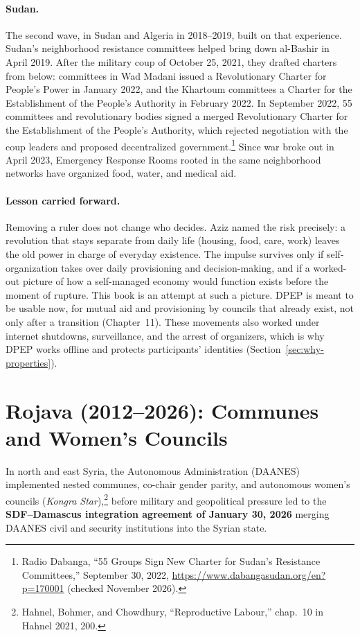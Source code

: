 \documentclass[10pt,twoside,openany]{book}
\theoremstyle{dpepstyle}
\begin{document}
\paragraph{Sudan.} The second wave, in Sudan and Algeria in 2018--2019, built on that experience. Sudan's neighborhood resistance committees helped bring down al-Bashir in April 2019. After the military coup of October 25, 2021, they drafted charters from below: committees in Wad Madani issued a Revolutionary Charter for People's Power in January 2022, and the Khartoum committees a Charter for the Establishment of the People's Authority in February 2022. In September 2022, 55 committees and revolutionary bodies signed a merged Revolutionary Charter for the Establishment of the People's Authority, which rejected negotiation with the coup leaders and proposed decentralized government.\footnote{Radio Dabanga, ``55 Groups Sign New Charter for Sudan's Resistance Committees,'' September 30, 2022, \url{https://www.dabangasudan.org/en?p=170001} (checked November 2026).} Since war broke out in April 2023, Emergency Response Rooms rooted in the same neighborhood networks have organized food, water, and medical aid.

\paragraph{Lesson carried forward.} Removing a ruler does not change who decides. Aziz named the risk precisely: a revolution that stays separate from daily life (housing, food, care, work) leaves the old power in charge of everyday existence. The impulse survives only if self-organization takes over daily provisioning and decision-making, and if a worked-out picture of how a self-managed economy would function exists before the moment of rupture. This book is an attempt at such a picture. DPEP is meant to be usable now, for mutual aid and provisioning by councils that already exist, not only after a transition (Chapter~11). These movements also worked under internet shutdowns, surveillance, and the arrest of organizers, which is why DPEP works offline and protects participants' identities (Section~\ref{sec:why-properties}).

\section{Rojava (2012--2026): Communes and Women's Councils}
\label{sec:hist-rojava}

In north and east Syria, the Autonomous Administration (DAANES) implemented nested communes, co-chair gender parity, and autonomous women's councils (\emph{Kongra Star}),\footnote{Hahnel, Bohmer, and Chowdhury, ``Reproductive Labour,'' chap.~10 in Hahnel 2021, 200.} before military and geopolitical pressure led to the \textbf{SDF--Damascus integration agreement of January 30, 2026} merging DAANES civil and security institutions into the Syrian state.
\end{document}
